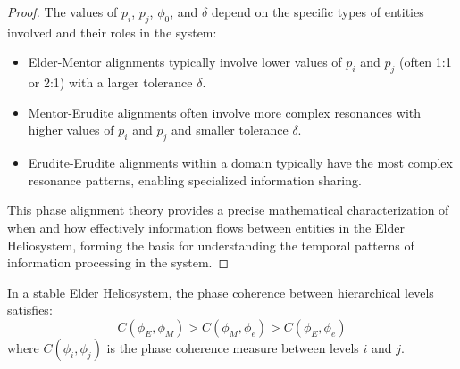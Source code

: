\begin{proof}
The values of $p_i$, $p_j$, $\phi_0$, and $\delta$ depend on the specific types of entities involved and their roles in the system:
\begin{itemize}
    \item Elder-Mentor alignments typically involve lower values of $p_i$ and $p_j$ (often 1:1 or 2:1) with a larger tolerance $\delta$.
    \item Mentor-Erudite alignments often involve more complex resonances with higher values of $p_i$ and $p_j$ and smaller tolerance $\delta$.
    \item Erudite-Erudite alignments within a domain typically have the most complex resonance patterns, enabling specialized information sharing.
\end{itemize}

This phase alignment theory provides a precise mathematical characterization of when and how effectively information flows between entities in the Elder Heliosystem, forming the basis for understanding the temporal patterns of information processing in the system.
\end{proof}

\begin{theorem}
In a stable Elder Heliosystem, the phase coherence between hierarchical levels satisfies:
\begin{equation}
C(\phi_E, \phi_M) > C(\phi_M, \phi_e) > C(\phi_E, \phi_e)
\end{equation}
where $C(\phi_i, \phi_j)$ is the phase coherence measure between levels $i$ and $j$.
\end{theorem}

